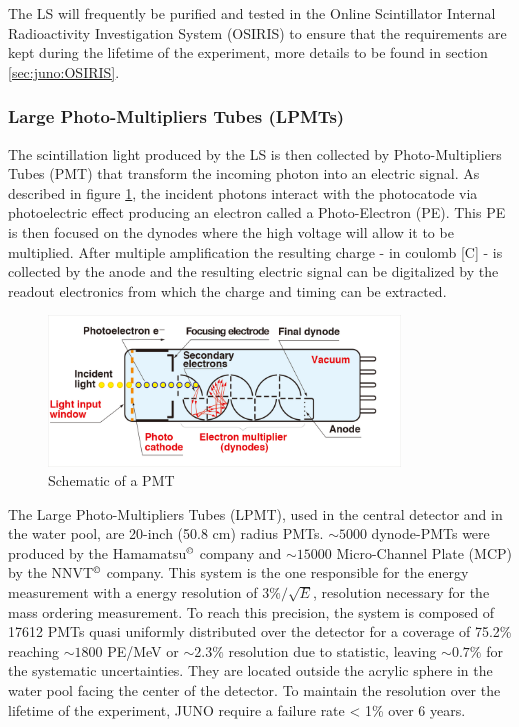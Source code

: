 \documentclass[../main.tex]{subfiles}
\begin{document}
The LS will frequently be purified and tested in the Online Scintillator Internal Radioactivity Investigation System (OSIRIS) \cite{juno_collaboration_design_2021} to ensure that the requirements are kept during the lifetime of the experiment, more details to be found in section \ref{sec:juno:OSIRIS}.

\subsubsection{Large Photo-Multipliers Tubes (LPMTs)}
\label{sec:juno:LPMT}

The scintillation light produced by the LS is then collected by Photo-Multipliers Tubes (PMT) that transform the incoming photon into an electric signal. As described in figure \ref{fig:juno:pmt-schem}, the incident photons interact with the photocatode via photoelectric effect producing an electron called a Photo-Electron (PE). This PE is then focused on the dynodes where the high voltage will allow it to be multiplied. After multiple amplification the resulting charge - in coulomb [C] - is collected by the anode and the resulting electric signal can be digitalized by the readout electronics from which the charge and timing can be extracted.

\begin{figure}[ht]
  \centering
  \includegraphics[height=4cm]{images/juno/pmt_schematic.png}
  \caption{Schematic of a PMT}
  \label{fig:juno:pmt-schem}
\end{figure}

The Large Photo-Multipliers Tubes (LPMT), used in the central detector and in the water pool, are 20-inch (50.8 cm) radius PMTs. $\sim 5000$ dynode-PMTs \cite{noauthor_photomultiplier_nodate} were produced by the Hamamatsu$^{\copyright}$ company and $\sim 15000$ Micro-Channel Plate (MCP) \cite{abusleme_mass_2022} by the NNVT$^{\copyright}$ company. This system is the one responsible for the energy measurement with a energy resolution of $3\%/\sqrt{E}$, resolution necessary for the mass ordering measurement. To reach this precision, the system is composed of 17612 PMTs quasi uniformly distributed over the detector for a coverage of 75.2\% reaching $\sim 1800$ PE/MeV or $\sim 2.3 \%$ resolution due to statistic, leaving $\sim 0.7\%$ for the systematic uncertainties. They are located outside the acrylic sphere in the water pool facing the center of the detector.
To maintain the resolution over the lifetime of the experiment, JUNO require a failure rate < 1\% over 6 years.
\end{document}
